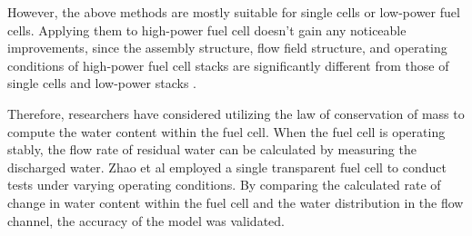 \par
However, the above methods are mostly suitable for single cells or low-power fuel cells. Applying them to high-power fuel cell doesn't gain any noticeable improvements\cite{tangRecentProgressUse2020,jiangMicrobialFuelCell2018,dotelliCombiningElectricalPressure2016,millerReviewPolymerElectrolyte2011,nagulapatiMachineLearningBased2023}, since the assembly structure, flow field structure, and operating conditions of high-power fuel cell stacks are significantly different from those of single cells and low-power stacks \cite{verhaertWaterManagementAlkaline2011}.

\par
Therefore, researchers have considered utilizing the law of conservation of mass to compute the water content within the fuel cell. When the fuel cell is operating stably, the flow rate of residual water can be calculated by measuring the discharged water. Zhao et al\cite{zhaoStudyWaterTransport2021} employed a single transparent fuel cell to conduct tests under varying operating conditions. By comparing the calculated rate of change in water content within the fuel cell and the water distribution in the flow channel, the accuracy of the model was validated.


